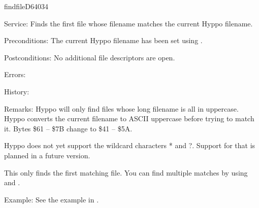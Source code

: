 %
\newpage
\begin{hyppotrap}{findfile}{D640}{34}
\item [Service:]
  Finds the first file whose filename matches the current Hyppo filename.
\item [Preconditions:]
  The current Hyppo filename has been set using .
\item [Postconditions:]
  No additional file descriptors are open.
\item [Errors:]
\item [History:]
\item [Remarks:]
  Hyppo will only find files whose long filename is all in uppercase.
  Hyppo converts the current filename to ASCII uppercase before trying
  to match it. Bytes \$61 -- \$7B change to \$41 -- \$5A.

  Hyppo does not yet support the wildcard characters * and ?. Support
  for that is planned in a future version.

  This only finds the first matching file. You can find multiple matches by
  using  and .
\item [Example:]
  See the example in .
\end{hyppotrap}


